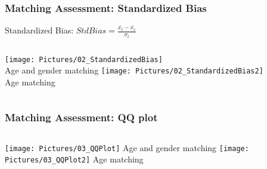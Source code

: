 \documentclass[xcolor=table]{beamer}
\begin{document}

\begin{frame}
	\frametitle{Matching Assessment: Standardized Bias}
	Standardized Bias: $Std Bias = \frac{\bar{x_t}-\bar{x_c}}{\sigma _t}$
	\begin{columns}[c]
		\vfill
		\centering		
		\texttt{[image: Pictures/02\_StandardizedBias]}\\
		Age and gender matching
		\vfill
		\vfill
		\centering		
		\texttt{[image: Pictures/02\_StandardizedBias2]}\\
		Age matching
		\vfill
	\end{columns}
\end{frame}


\begin{frame}
	\frametitle{Matching Assessment: QQ plot}
	\begin{columns}[c]
		\centering
		\vfill		
		\texttt{[image: Pictures/03\_QQPlot]}
		Age and gender matching
		\vfill
		\centering
		\vfill
		\texttt{[image: Pictures/03\_QQPlot2]}
		Age matching
		\vfill
	\end{columns}
\end{frame}

\end{document}
